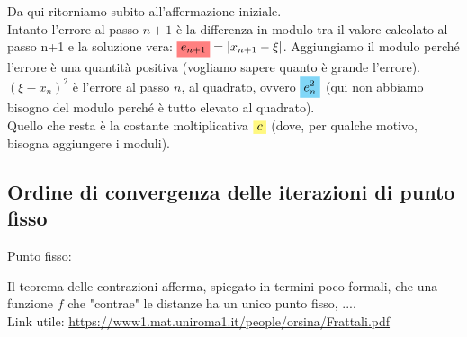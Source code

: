Da qui ritorniamo subito all'affermazione iniziale.\\
Intanto l'errore al passo $n+1$ è la differenza in modulo tra il valore calcolato al passo n+1 e la soluzione vera: $\highlightRED{e_{n+1}}=|x_{n+1}-\xi|$. Aggiungiamo il modulo perché l'errore è una quantità positiva (vogliamo sapere quanto è grande l'errore).\\
$(\xi - x_n)^2$ è l'errore al passo $n$, al quadrato, ovvero $\highlightCYAN{e_n^2}$ (qui non abbiamo bisogno del modulo perché è tutto elevato al quadrato).\\
Quello che resta è la costante moltiplicativa $\highlightYELLOW{c}$ (dove, per qualche motivo, bisogna aggiungere i moduli).

\subsection{Ordine di convergenza delle iterazioni di punto fisso}
Punto fisso:

Il teorema delle contrazioni afferma, spiegato in termini poco formali, che una funzione $f$ che "contrae" le distanze ha un unico punto fisso, ....\\
Link utile: \url{https://www1.mat.uniroma1.it/people/orsina/Frattali.pdf}


